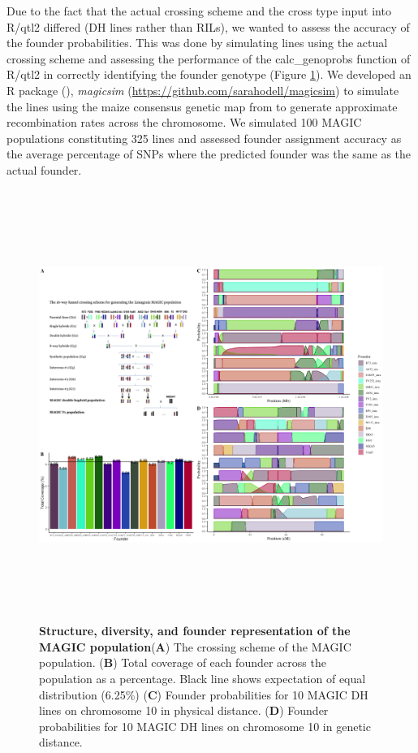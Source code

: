 \documentclass[article,9pt,twocolumn,twoside]{rilabRxiv}
\begin{document}
Due to the fact that the actual crossing scheme and the cross type input into R/qtl2 differed (DH lines rather than RILs), we wanted to assess the accuracy of the founder probabilities.
This was done by simulating lines using the actual crossing scheme and assessing the performance of the calc\_genoprobs function of R/qtl2 in correctly identifying the founder genotype (Figure \ref{fig:figure1}).
We developed an R package (\cite{R}), \emph{magicsim} (\url{https://github.com/sarahodell/magicsim}) to simulate the lines using the maize consensus genetic map from \citep{Ogut} to generate approximate recombination rates across the chromosome.
We simulated 100 MAGIC populations constituting 325 lines and assessed founder assignment accuracy as the average percentage of SNPs where the predicted founder was the same as the actual founder.

\begin{figure}[ht!]
\centering
\includegraphics[width=\textwidth,height=14cm]{figures/Methods_Fig1.png}
\caption{\textbf{Structure, diversity, and founder representation of the MAGIC population}(\textbf{A}) The crossing scheme of the MAGIC population. (\textbf{B}) Total coverage of each founder across the population as a percentage. Black line shows expectation of equal distribution (6.25\%)  (\textbf{C}) Founder probabilities for 10 MAGIC DH lines on chromosome 10 in physical distance. (\textbf{D}) Founder probabilities for 10 MAGIC DH lines on chromosome 10 in genetic distance.}
\label{fig:figure1}
\end{figure}
\end{document}
